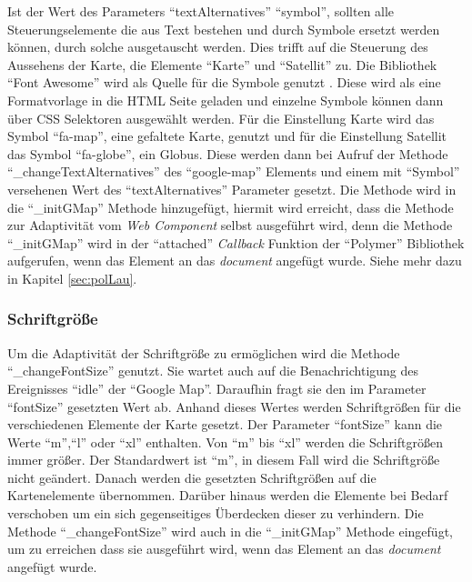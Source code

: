 \documentclass[12pt, paper=a4, bibtotoc, toc=listof, headsepline=true, numbers=endperiod]{scrreprt}
\begin{document}
	\newline
	Ist der Wert des Parameters \enquote{textAlternatives} \enquote{symbol}, sollten alle Steuerungselemente die aus Text bestehen und durch Symbole ersetzt werden können, durch solche ausgetauscht werden. Dies trifft auf die Steuerung des Aussehens der Karte, die Elemente \enquote{Karte} und \enquote{Satellit} zu. Die Bibliothek \enquote{Font Awesome} wird als Quelle für die Symbole genutzt \cite{fonAwe}. Diese wird als eine Formatvorlage in die \ac{HTML} Seite geladen und einzelne Symbole können dann über \ac{CSS} Selektoren ausgewählt werden. Für die Einstellung Karte wird das Symbol \enquote{fa-map}, eine gefaltete Karte, genutzt und für die Einstellung Satellit das Symbol \enquote{fa-globe}, ein Globus. Diese werden dann bei Aufruf der Methode \enquote{\_changeTextAlternatives} des \enquote{google-map} Elements und einem mit \enquote{Symbol} versehenen Wert des \enquote{textAlternatives} Parameter gesetzt. Die Methode wird in die \enquote{\_initGMap} Methode hinzugefügt, hiermit wird erreicht, dass die Methode zur Adaptivität vom \emph{Web Component} selbst ausgeführt wird, denn die Methode \enquote{\_initGMap} wird in der \enquote{attached} \emph{Callback} Funktion der \enquote{Polymer} Bibliothek aufgerufen, wenn das Element an das \emph{document} angefügt wurde. Siehe mehr dazu in Kapitel \ref{sec:polLau}.
	\subsubsection{Schriftgröße}
	\label{sec:fontsize}
	Um die Adaptivität der Schriftgröße zu ermöglichen wird die Methode \enquote{\_changeFontSize} genutzt.  Sie wartet auch auf die Benachrichtigung des Ereignisses \enquote{idle} der \enquote{Google Map}. Daraufhin fragt sie den im Parameter \enquote{fontSize} gesetzten Wert ab. Anhand dieses Wertes werden Schriftgrößen für die verschiedenen Elemente der Karte gesetzt. Der Parameter \enquote{fontSize} kann die Werte \enquote{m},\enquote{l} oder \enquote{xl} enthalten. Von \enquote{m} bis \enquote{xl} werden die Schriftgrößen immer größer. Der Standardwert ist \enquote{m}, in diesem Fall wird die Schriftgröße nicht geändert. Danach werden die gesetzten Schriftgrößen auf die Kartenelemente übernommen. Darüber hinaus werden die Elemente bei Bedarf verschoben um ein sich gegenseitiges Überdecken dieser zu verhindern. Die Methode \enquote{\_changeFontSize} wird auch in die \enquote{\_initGMap} Methode eingefügt, um zu erreichen dass sie ausgeführt wird, wenn das Element an das \emph{document} angefügt wurde.
\end{document}
